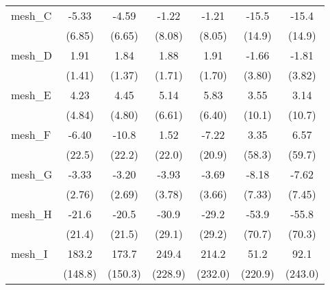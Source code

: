 \begin{tabular}{lcccccc}
   mesh\_C                                                     & -5.33         & -4.59         & -1.22          & -1.21         & -15.5         & -15.4\\   
                                                               & (6.85)        & (6.65)        & (8.08)         & (8.05)        & (14.9)        & (14.9)\\   
   mesh\_D                                                     & 1.91          & 1.84          & 1.88           & 1.91          & -1.66         & -1.81\\   
                                                               & (1.41)        & (1.37)        & (1.71)         & (1.70)        & (3.80)        & (3.82)\\   
   mesh\_E                                                     & 4.23          & 4.45          & 5.14           & 5.83          & 3.55          & 3.14\\   
                                                               & (4.84)        & (4.80)        & (6.61)         & (6.40)        & (10.1)        & (10.7)\\   
   mesh\_F                                                     & -6.40         & -10.8         & 1.52           & -7.22         & 3.35          & 6.57\\   
                                                               & (22.5)        & (22.2)        & (22.0)         & (20.9)        & (58.3)        & (59.7)\\   
   mesh\_G                                                     & -3.33         & -3.20         & -3.93          & -3.69         & -8.18         & -7.62\\   
                                                               & (2.76)        & (2.69)        & (3.78)         & (3.66)        & (7.33)        & (7.45)\\   
   mesh\_H                                                     & -21.6         & -20.5         & -30.9          & -29.2         & -53.9         & -55.8\\   
                                                               & (21.4)        & (21.5)        & (29.1)         & (29.2)        & (70.7)        & (70.3)\\   
   mesh\_I                                                     & 183.2         & 173.7         & 249.4          & 214.2         & 51.2          & 92.1\\   
                                                               & (148.8)       & (150.3)       & (228.9)        & (232.0)       & (220.9)       & (243.0)\\   

\end{tabular}
